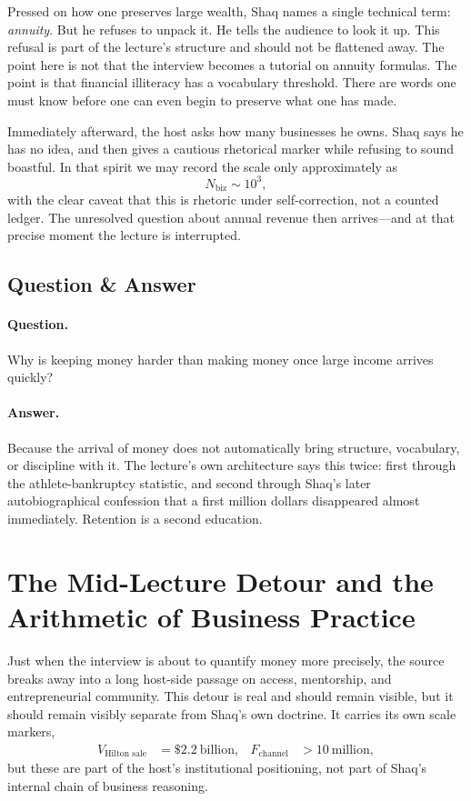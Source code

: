 Pressed on how one preserves large wealth, Shaq names a single technical term: \emph{annuity}. But he refuses to unpack it. He tells the audience to look it up. This refusal is part of the lecture's structure and should not be flattened away. The point here is not that the interview becomes a tutorial on annuity formulas. The point is that financial illiteracy has a vocabulary threshold. There are words one must know before one can even begin to preserve what one has made.

Immediately afterward, the host asks how many businesses he owns. Shaq says he has no idea, and then gives a cautious rhetorical marker while refusing to sound boastful. In that spirit we may record the scale only approximately as
\begin{equation}
N_{\text{biz}} \sim 10^3,
\end{equation}
with the clear caveat that this is rhetoric under self-correction, not a counted ledger. The unresolved question about annual revenue then arrives---and at that precise moment the lecture is interrupted.

\subsection{Question \& Answer}

\paragraph{Question.} Why is keeping money harder than making money once large income arrives quickly?

\paragraph{Answer.} Because the arrival of money does not automatically bring structure, vocabulary, or discipline with it. The lecture's own architecture says this twice: first through the athlete-bankruptcy statistic, and second through Shaq's later autobiographical confession that a first million dollars disappeared almost immediately. Retention is a second education.

\section{The Mid-Lecture Detour and the Arithmetic of Business Practice}

Just when the interview is about to quantify money more precisely, the source breaks away into a long host-side passage on access, mentorship, and entrepreneurial community. This detour is real and should remain visible, but it should remain visibly separate from Shaq's own doctrine. It carries its own scale markers,
\begin{align}
V_{\text{Hilton sale}} &= \text{\$}2.2\ \text{billion}, &
F_{\text{channel}} &> 10\ \text{million},
\end{align}
but these are part of the host's institutional positioning, not part of Shaq's internal chain of business reasoning.

